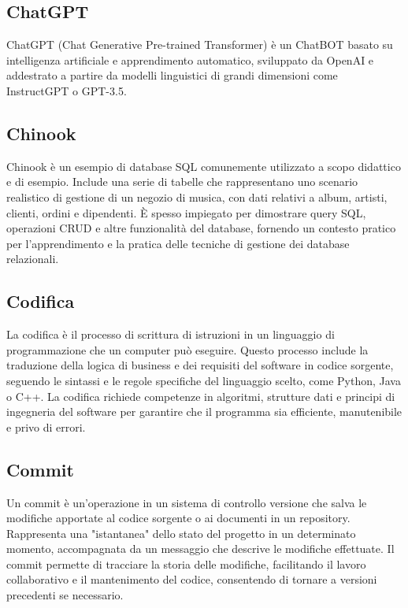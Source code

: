 \vspace{2em}
\subsection*{ChatGPT}
ChatGPT (Chat Generative Pre-trained Transformer) è un ChatBOT basato su intelligenza artificiale e apprendimento automatico, sviluppato da OpenAI e addestrato a partire da modelli linguistici di grandi dimensioni come InstructGPT o GPT-3.5.

\vspace{2em}
\subsection*{Chinook}
Chinook è un esempio di database SQL comunemente utilizzato a scopo didattico e di esempio. Include una serie di tabelle che rappresentano uno scenario realistico di gestione di un negozio di musica, con dati relativi a album, artisti, clienti, ordini e dipendenti. È spesso impiegato per dimostrare query SQL, operazioni CRUD e altre funzionalità del database, fornendo un contesto pratico per l'apprendimento e la pratica delle tecniche di gestione dei database relazionali.

\vspace{2em}
\subsection*{Codifica}
La codifica è il processo di scrittura di istruzioni in un linguaggio di programmazione che un computer può eseguire. Questo processo include la traduzione della logica di business e dei requisiti del software in codice sorgente, seguendo le sintassi e le regole specifiche del linguaggio scelto, come Python, Java o C++. La codifica richiede competenze in algoritmi, strutture dati e principi di ingegneria del software per garantire che il programma sia efficiente, manutenibile e privo di errori.

\vspace{2em}
\subsection*{Commit}
Un commit è un'operazione in un sistema di controllo versione che salva le modifiche apportate al codice sorgente o ai documenti in un repository. Rappresenta una "istantanea" dello stato del progetto in un determinato momento, accompagnata da un messaggio che descrive le modifiche effettuate. Il commit permette di tracciare la storia delle modifiche, facilitando il lavoro collaborativo e il mantenimento del codice, consentendo di tornare a versioni precedenti se necessario.


